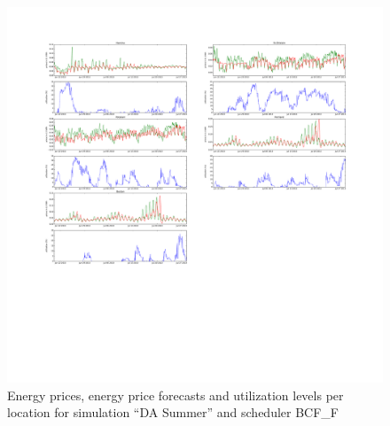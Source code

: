 \begin{figure}[htbp]
	\centering
	\vspace*{-0.6in}
	\hspace*{-1.4in}
		\includegraphics[width=1.60\textwidth]{figures/appendix_simulation_results/DA_Summer_scenario_3.pdf}
	\vspace*{-2.8in}
	\caption{Energy prices, energy price forecasts and utilization levels per location for simulation ``DA Summer'' and scheduler BCF\_F}
	\label{fig:app_DA_Summer_scenario_3}
\end{figure}

